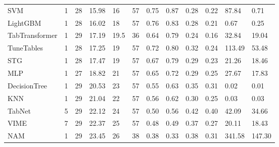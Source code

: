 \begin{tabular}{lllllrllllll}
SVM & 1 & 28 & 15.98 & 16 & 57 & 0.75 & 0.87 & 0.28 & 0.22 & 87.84 & 0.71 \\
LightGBM & 1 & 28 & 16.02 & 18 & 57 & 0.76 & 0.83 & 0.28 & 0.21 & 0.67 & 0.25 \\
TabTransformer & 1 & 29 & 17.19 & 19.5 & 36 & 0.64 & 0.79 & 0.24 & 0.16 & 32.84 & 19.04 \\
TuneTables & 1 & 28 & 17.25 & 19 & 57 & 0.72 & 0.80 & 0.32 & 0.24 & 113.49 & 53.48 \\
STG & 1 & 28 & 17.47 & 19 & 57 & 0.67 & 0.79 & 0.29 & 0.23 & 21.26 & 18.46 \\
MLP & 1 & 27 & 18.82 & 21 & 57 & 0.65 & 0.72 & 0.29 & 0.25 & 27.67 & 17.83 \\
DecisionTree & 1 & 29 & 20.53 & 23 & 57 & 0.55 & 0.63 & 0.35 & 0.31 & 0.02 & 0.01 \\
KNN & 1 & 29 & 21.04 & 22 & 57 & 0.56 & 0.62 & 0.30 & 0.25 & 0.03 & 0.03 \\
TabNet & 5 & 29 & 22.12 & 24 & 57 & 0.50 & 0.56 & 0.42 & 0.40 & 42.09 & 34.66 \\
VIME & 7 & 29 & 22.37 & 25 & 57 & 0.48 & 0.49 & 0.37 & 0.27 & 20.11 & 18.43 \\
NAM & 1 & 29 & 23.45 & 26 & 38 & 0.38 & 0.33 & 0.38 & 0.31 & 341.58 & 147.30 \\
\bottomrule
\end{tabular}
